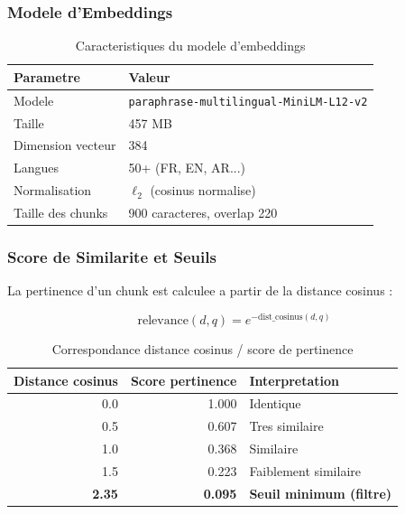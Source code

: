 \documentclass[12pt,a4paper]{article}
\begin{document}
\subsubsection{Modele d'Embeddings}

\begin{table}[h]
\centering
\caption{Caracteristiques du modele d'embeddings}
\begin{tabular}{ll}
\toprule
\textbf{Parametre} & \textbf{Valeur} \\
\midrule
Modele & \texttt{paraphrase-multilingual-MiniLM-L12-v2} \\
Taille & 457 MB \\
Dimension vecteur & 384 \\
Langues & 50+ (FR, EN, AR...) \\
Normalisation & $\ell_2$ (cosinus normalise) \\
Taille des chunks & 900 caracteres, overlap 220 \\
\bottomrule
\end{tabular}
\end{table}

\subsubsection{Score de Similarite et Seuils}

La pertinence d'un chunk est calculee a partir de la distance cosinus :

\begin{equation}
\text{relevance}(d, q) = e^{-\text{dist\_cosinus}(d, q)}
\label{eq:relevance}
\end{equation}

\begin{table}[h]
\centering
\caption{Correspondance distance cosinus / score de pertinence}
\begin{tabular}{rrl}
\toprule
\textbf{Distance cosinus} & \textbf{Score pertinence} & \textbf{Interpretation} \\
\midrule
0.0 & 1.000 & Identique \\
0.5 & 0.607 & Tres similaire \\
1.0 & 0.368 & Similaire \\
1.5 & 0.223 & Faiblement similaire \\
\textbf{2.35} & \textbf{0.095} & \textbf{Seuil minimum (filtre)} \\
\bottomrule
\end{tabular}
\end{table}
\end{document}
